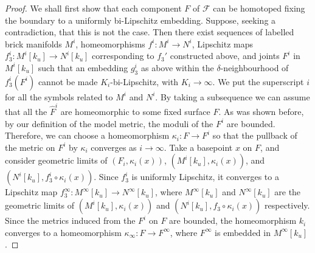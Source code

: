 \documentclass{amsart}
\theoremstyle{definition}
\numberwithin{figure}{section}
\numberwithin{equation}{section}
\def\cv{\mathcal{V}}
\begin{document}
\begin{proof}
We shall first show that  each component $ F$ of $\mathcal F$ can be homotoped fixing the boundary to a uniformly bi-Lipschitz embedding.
Suppose, seeking a contradiction, that this is not the case.
Then there exist   sequences of labelled brick manifolds $M^i$, homeomorphisms $f^i: M^i \rightarrow N^i$,  Lipschitz maps $f^i_3: M^i[k_u] \rightarrow N^i[k_u]$ corresponding to $f_3'$ constructed above, and joints $F^i$ in $M^i[k_u]$ such that an embedding $g_3^i$ as above within the  $\delta$-neighbourhood of $f^i_3(F^i)$ cannot be made $K_i$-bi-Lipschitz, with $K_i \rightarrow \infty$.
We put the superscript $i$ for all the symbols related to $M^i$ and $N^i$.
By taking a subsequence we can assume that all the $\hat F^i$ are homeomorphic to some fixed surface $F$.
As was shown before, by our definition of the model metric, the moduli of the $F^i$  are bounded.
Therefore, we can choose a homeomorphism $\kappa_i : F \rightarrow F^i$ so that the pullback of the metric on $F^i$ by $\kappa_i$ converges as $i \rightarrow \infty$.
Take a basepoint $x$ on $F$, 
and consider geometric limits of $(F_i, \kappa_i(x))$, $(M^i[k_u], \kappa_i(x))$, and $(N^i[k_u], f^i_3 \circ \kappa_i(x))$.
Since $f^i_3$ is uniformly Lipschitz, it converges to a Lipschitz map $f^\infty_3: M^\infty[k_u] \rightarrow N^\infty[k_u]$, where $M^\infty[k_u]$ and $N^\infty[k_u]$ are the geometric limits of $(M^i[k_u], \kappa_i(x))$ and $(N^i[k_u], f_3 \circ \kappa_i(x))$ respectively.
Since the metrics induced from  the $F^i$ on $F$ are bounded, the homeomorphism $k_i$ converges to a homeomorphism $\kappa_\infty: F \rightarrow F^\infty$, where $F^\infty$ is embedded in $M^\infty[k_u]$.


\end{proof}
\end{document}
